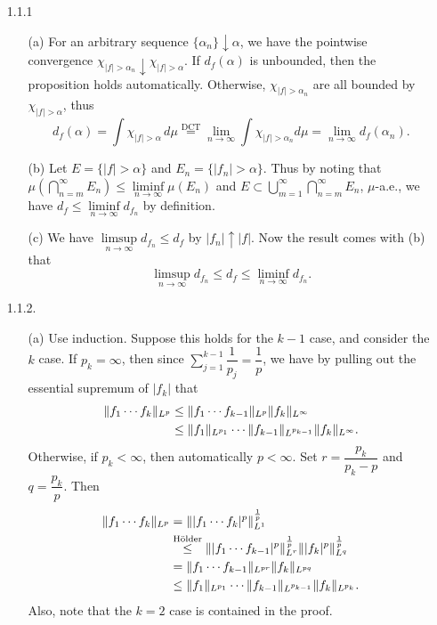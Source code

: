 \begin{enumerate}
\item[1.1.1]
    \begin{enumerate}
    \item[(a)] For an arbitrary sequence $\{\alpha_{n}\} \downarrow \alpha$, 
    we have the pointwise convergence 
    $\chi_{|f|>\alpha_{n}} \downarrow \chi_{|f|>\alpha}$. 
    If $d_{f}(\alpha)$ is unbounded, then the proposition holds automatically. 
    Otherwise, $\chi_{|f|>\alpha_{n}}$ are all bounded by $\chi_{|f|>\alpha}$, thus
    \[d_{f}(\alpha) = \int \chi_{|f|>\alpha}\,d\mu \overset{\text{DCT}} 
    = \lim_{n \rightarrow \infty}\int \chi_{|f|>\alpha_{n}}d\mu 
    = \lim_{n \rightarrow \infty}d_{f}(\alpha_{n}).\]

    \item[(b)] Let $E=\{|f|>\alpha\}$ and $E_{n}=\{|f_{n}|>\alpha\}$. 
    Thus by noting that $\mu(\bigcap_{n=m}^{\infty}E_{n}) 
    \leq \liminf\limits_{n \rightarrow \infty} \mu(E_{n})$ and 
    $E \subset \bigcup_{m=1}^{\infty}\bigcap_{n=m}^{\infty}E_{n}$, $\mu$-a.e., 
    we have $d_{f} \leq \liminf\limits_{n \rightarrow \infty} d_{f_{n}}$ by definition.

    \item[(c)] We have $\limsup\limits_{n \rightarrow \infty} d_{f_{n}} \leq d_{f}$ 
    by $|f_{n}| \uparrow |f|$. Now the result comes with (b) that
    \[\limsup_{n \rightarrow \infty} d_{f_{n}} \leq d_{f} 
    \leq \liminf_{n \rightarrow \infty}d_{f_{n}}.\]
    \end{enumerate}

\item[1.1.2.]
    \begin{enumerate}
    \item[(a)] Use induction. Suppose this holds for the $k-1$ case, 
    and consider the $k$ case. If $p_{k}=\infty$, 
    then since $\sum\limits_{j=1}^{k-1}\dfrac{1}{p_{j}}=\dfrac{1}{p}$, 
    we have by pulling out the essential supremum of $|f_{k}|$ that 
    \begin{align*}\Vert f_{1}\cdots f_{k} \Vert_{L^p} &\leq \Vert f_{1}\cdots f_{k-1} \Vert_{L^p}\Vert f_{k} \Vert_{L^\infty}\\
    &\leq \Vert f_{1} \Vert_{L^{p_{1}}}\cdots\Vert f_{k-1} \Vert_{L^{p_{k-1}}}\Vert f_{k} \Vert_{L^\infty}.\end{align*}
    Otherwise, if $p_{k}<\infty$, then automatically $p < \infty$. 
    Set $r=\dfrac{p_{k}}{p_{k}-p}$ and $q=\dfrac{p_{k}}{p}$. Then
    \begin{equation*}\begin{aligned}
    \Vert f_{1}\cdots f_{k} \Vert_{L^p} &= \Vert |f_{1}\cdots f_{k}|^p \Vert_{L^1}^{\frac{1}{p}}\\
    &\overset{\text{Hölder}}{\leq} 
    \Vert |f_{1}\cdots f_{k-1}|^{p} \Vert_{L^r}^{\frac{1}{p}}\Vert |f_{k}|^{p} \Vert_{L^q}^{\frac{1}{p}} \\
    &=\Vert f_{1}\cdots f_{k-1} \Vert_{L^{pr}}\Vert f_{k} \Vert_{L^{pq}} \\
    &\leq \Vert f_{1} \Vert_{L^{p_{1}}}\cdots\Vert f_{k-1} \Vert_{L^{p_{k-1}}}\Vert f_{k} \Vert_{L^{p_{k}}}.
    \end{aligned}\end{equation*}
    Also, note that the $k=2$ case is contained in the proof.


\end{enumerate}
\end{enumerate}
